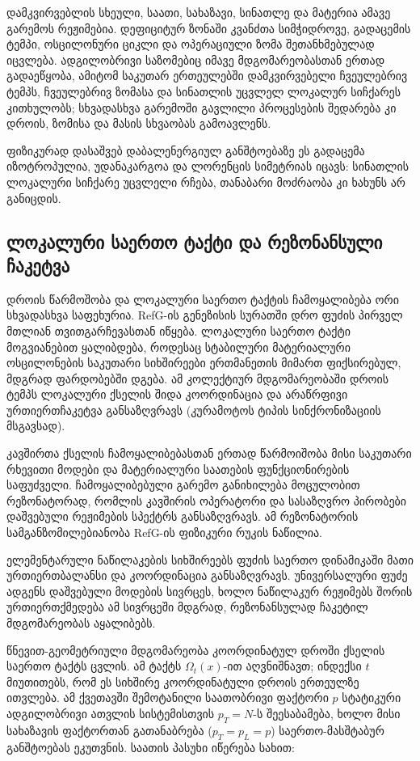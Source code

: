 \documentclass[11pt,a4paper]{article}
\begin{document}
დამკვირვებლის სხეული, საათი, სახაზავი, სინათლე და მატერია ამავე გარემოს რეჟიმებია. დეფიციტურ ზონაში კვანძთა სიმჭიდროვე, გადაცემის ტემპი, ოსცილონური ციკლი და ოპერაციული ზომა შეთანხმებულად იცვლება. ადგილობრივი საზომებიც იმავე მდგომარეობასთან ერთად გადაეწყობა, ამიტომ საკუთარ ერთეულებში დამკვირვებელი ჩვეულებრივ ტემპს, ჩვეულებრივ ზომასა და სინათლის უცვლელ ლოკალურ სიჩქარეს კითხულობს; სხვადასხვა გარემოში გავლილი პროცესების შედარება კი დროის, ზომისა და მასის სხვაობას გამოავლენს.

ფიზიკურად დასაშვებ დაბალენერგიულ განშტოებაზე ეს გადაცემა იზოტროპულია, უდანაკარგოა და ლორენცის სიმეტრიას იცავს: სინათლის ლოკალური სიჩქარე უცვლელი რჩება, თანაბარი მოძრაობა კი ხახუნს არ განიცდის.


\subsection{ლოკალური საერთო ტაქტი და რეზონანსული ჩაკეტვა}

დროის წარმოშობა და ლოკალური საერთო ტაქტის ჩამოყალიბება ორი სხვადასხვა საფეხურია. RefG-ის გენეზისის სურათში დრო ფუძის პირველ მთლიან თვითგარჩევასთან იწყება. ლოკალური საერთო ტაქტი მოგვიანებით ყალიბდება, როდესაც სტაბილური მატერიალური ოსცილონების საკუთარი სიხშირეები ერთმანეთის მიმართ ფიქსირებულ, მდგრად ფარდობებში დგება. ამ კოლექტიურ მდგომარეობაში დროის ტემპს ლოკალური ქსელის შიდა კოორდინაცია და არაწრფივი ურთიერთჩაკეტვა განსაზღვრავს (კურამოტოს ტიპის სინქრონიზაციის მსგავსად).

კავშირთა ქსელის ჩამოყალიბებასთან ერთად წარმოიშობა მისი საკუთარი რხევითი მოდები და მატერიალური საათების ფუნქციონირების საფუძველი. ჩამოყალიბებული გარემო განიხილება მოცულობით რეზონატორად, რომლის კავშირის ოპერატორი და სასაზღვრო პირობები დაშვებული რეჟიმების სპექტრს განსაზღვრავს. ამ რეზონატორის სამგანზომილებიანობა RefG-ის ფიზიკური რუკის ნაწილია.

ელემენტარული ნაწილაკების სიხშირეებს ფუძის საერთო დინამიკაში მათი ურთიერთბალანსი და კოორდინაცია განსაზღვრავს. უნივერსალური ფუძე ადგენს დაშვებული მოდების სივრცეს, ხოლო ნაწილაკურ რეჟიმებს შორის ურთიერთქმედება ამ სივრცეში მდგრად, რეზონანსულად ჩაკეტილ მდგომარეობას აყალიბებს.

წნევით-გეომეტრიული მდგომარეობა კოორდინატულ დროში ქსელის საერთო ტაქტს ცვლის. ამ ტაქტს $\Omega_t(x)$-ით აღვნიშნავთ; ინდექსი $t$ მიუთითებს, რომ ეს სიხშირე კოორდინატული დროის ერთეულზე ითვლება. ამ ქვეთავში შემოტანილი საათობრივი ფაქტორი $p$ სტატიკური ადგილობრივი ათვლის სისტემისთვის $p_T=N$-ს შეესაბამება, ხოლო მისი სახაზავის ფაქტორთან გათანაბრება ($p_T = p_L = p$) საერთო-მასშტაბურ განშტოებას ეკუთვნის. საათის პასუხი იწერება სახით:
\end{document}
